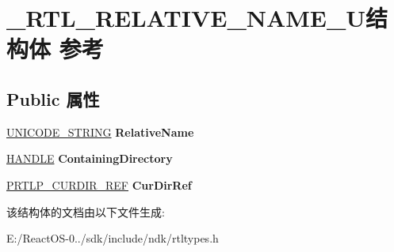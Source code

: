 \hypertarget{struct___r_t_l___r_e_l_a_t_i_v_e___n_a_m_e___u}{}\section{\+\_\+\+R\+T\+L\+\_\+\+R\+E\+L\+A\+T\+I\+V\+E\+\_\+\+N\+A\+M\+E\+\_\+\+U结构体 参考}
\label{struct___r_t_l___r_e_l_a_t_i_v_e___n_a_m_e___u}
\subsection*{Public 属性}
\begin{DoxyCompactItemize}
\item 
\mbox{\label{struct___r_t_l___r_e_l_a_t_i_v_e___n_a_m_e___u_a077c7bc7028e47707bacd91c470a613a}} 
\hyperlink{struct___u_n_i_c_o_d_e___s_t_r_i_n_g}{U\+N\+I\+C\+O\+D\+E\+\_\+\+S\+T\+R\+I\+NG} {\bfseries Relative\+Name}
\item 
\mbox{\label{struct___r_t_l___r_e_l_a_t_i_v_e___n_a_m_e___u_a13fa38365306ce636fac31e9baa8fe88}} 
\hyperlink{interfacevoid}{H\+A\+N\+D\+LE} {\bfseries Containing\+Directory}
\item 
\mbox{\label{struct___r_t_l___r_e_l_a_t_i_v_e___n_a_m_e___u_af5a6262618632be9579941359eab3ea1}} 
\hyperlink{struct___r_t_l_p___c_u_r_d_i_r___r_e_f}{P\+R\+T\+L\+P\+\_\+\+C\+U\+R\+D\+I\+R\+\_\+\+R\+EF} {\bfseries Cur\+Dir\+Ref}
\end{DoxyCompactItemize}


该结构体的文档由以下文件生成\+:\begin{DoxyCompactItemize}
\item 
E\+:/\+React\+O\+S-\/0../sdk/include/ndk/rtltypes.\+h\end{DoxyCompactItemize}
